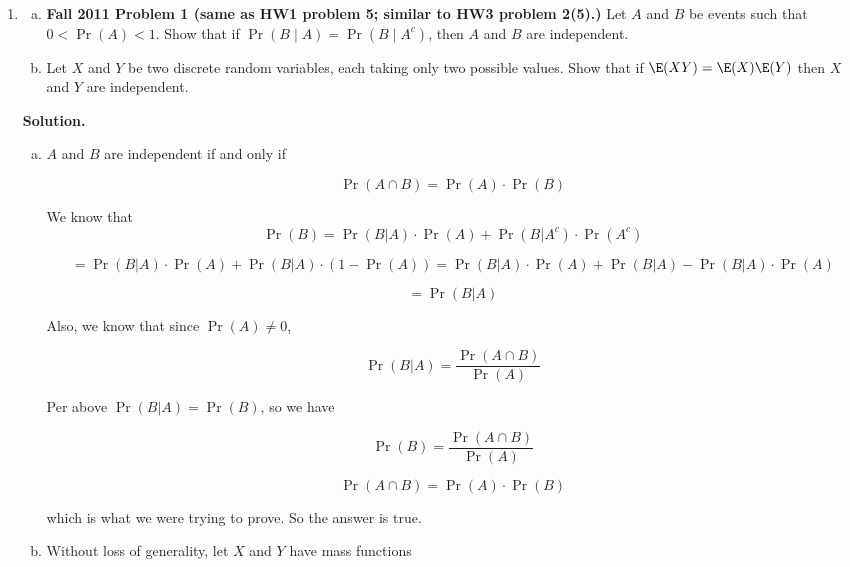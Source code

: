 \begin{enumerate}[(1)]

\item 

\begin{enumerate}[(a)]

\item \textbf{Fall 2011 Problem 1 (same as HW1 problem 5; similar to HW3 problem 2(5).)} Let \(A\) and \(B\) be events such that \( 0 < \Pr(A) < 1\). Show that if \(\Pr(B \mid A) = \Pr(B \mid A^c)\), then \(A\) and \(B\) are independent.

\item Let \(X\) and \(Y\) be two discrete random variables, each taking only two possible values. Show that if \(\E(XY) = \E(X) \E(Y)\) then \(X\) and \(Y\) are independent.


\end{enumerate}

\textbf{Solution.}

\begin{enumerate}[(a)]

\item  \(A\) and \(B\) are independent if and only if 

\[
\Pr(A \cap B) = \Pr(A)\cdot\Pr(B)
\]

We know that \[ \Pr(B) = \Pr(B|A)\cdot \Pr(A) + \Pr(B|A^c)\cdot\Pr(A^c)  \]

\[
= \Pr(B|A)\cdot \Pr(A) + \Pr(B|A)\cdot (1 - \Pr(A)) = \Pr(B|A)\cdot \Pr(A) + \Pr(B|A) - \Pr(B|A)\cdot \Pr(A) 
\]

\[
= \Pr(B|A)
\]

Also, we know that since \(\Pr(A) \neq 0\),

\[
\Pr(B|A) = \frac{\Pr(A \cap B)}{\Pr(A)} 
\]

Per above \(\Pr(B|A) = \Pr(B)\), so we have

\[
\Pr(B) = \frac{\Pr(A \cap B)}{\Pr(A)} 
\]

\[
\Pr(A \cap B)= \Pr(A) \cdot \Pr(B)
\]

which is what we were trying to prove. So the answer is \(\boxed{\text{true.}}\)

\item Without loss of generality, let \(X\) and \(Y\) have mass functions


\end{enumerate}
\end{enumerate}
